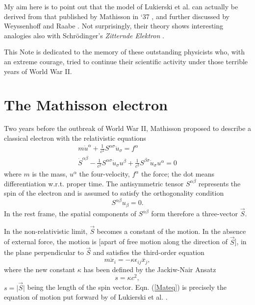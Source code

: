 \documentclass[a4paper,11pt]{article}
\let\ssection=\section
\renewcommand{\section}{\setcounter{equation}{0}\ssection}
\def\vS{\vec{S}}
\begin{document}
My aim here is to point out that the
model of Lukierski et al. can actually be derived
from that published by Mathisson in `37
\cite{Mathisson}, and further discussed by Weyssenhoff
and Raabe \cite{WeyRaa}.
Not surprisingly, their theory shows interesting analogies also
with Schr\"odinger's {\it Zitternde Elektron} \cite{Schr}.

This Note is dedicated
to the memory of these outstanding physicists who,
with an extreme courage, tried  to continue
their scientific activity
under those terrible years of World War II.


\section{The Mathisson electron}\label{Mathisson}


Two years before the outbreak of World War II,
  Mathisson \cite{Mathisson} proposed to
describe a classical electron with the relativistic equations
\begin{equation}
     \begin{array}{ll}
     m\dot{u}^\alpha+\displaystyle\frac{1}{c^2}S^{\alpha\sigma}
     \ddot{u}_{\sigma}=f^\alpha
     \\[8pt]
     \dot{S}^{\alpha\beta}-
     \displaystyle\frac{1}{c^2}S^{\alpha\sigma}
     \dot{u}_{\sigma}u^\beta
     +
     \displaystyle\frac{1}{c^2}S^{\beta\sigma}\dot{u}_{\sigma}u^\alpha
     =0
     \end{array}
     \label{RMeq}
\end{equation}
where $m$ is the mass, $u^\alpha$ the four-velocity,
$f^\alpha$ the force; the dot means differentiation w.r.t. proper time.
The antisymmetric tensor $S^{\alpha\beta}$ represents the
spin of the electron and is assumed to
satisfy the orthogonality condition
\begin{equation}
     S^{\alpha\beta}u_{\beta}=0.
     \label{spinconstr}
\end{equation}
In the rest frame, the spatial components of $S^{\alpha\beta}$
form therefore a three-vector $\vS$.

In the non-relativistic limit,
$\vS$ becomes a constant of the motion. In the absence of external force,
the motion is [apart of free motion along the direction of $\vS$],
in the plane perpendicular to $\vS$ and satisfies the third-order equation
\begin{equation}
     m\ddot{x}_{i}=-\kappa\epsilon_{ij}\dddot{x_{j}},
     \label{Mateq}
\end{equation}
where the new constant $\kappa$ has been defined by the
Jackiw-Nair Ansatz \cite{JaNa}
\begin{equation}
     s=\kappa c^2,
     \label{JNAnsatz}
\end{equation}
$s=\vert\vS\vert$ being the length of the spin vector.
Eqn. (\ref{Mateq}) is precisely the equation of motion
put forward by of Lukierski et al. \cite{LSZ}.
\end{document}
